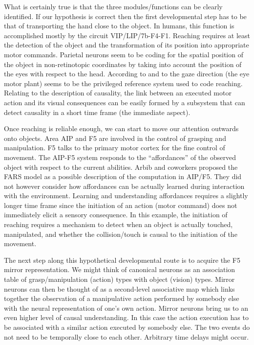 What is certainly true is that the three modules/functions can be 
clearly identified. If our hypothesis is correct then 
the first developmental step has to be that of transporting the hand 
close to the object. In humans, this function is accomplished mostly by the
circuit VIP/LIP/7b-F4-F1. Reaching requires at least the detection of
the object and the transformation of its position into appropriate 
motor commands. Parietal neurons seem to be coding for the spatial
position of the object in non-retinotopic coordinates by taking
into account the position of the eyes with respect to the head. 
According to \cite{pouget-ducom-torri-bavelier-2002} and 
to \cite{flanders-daghestani-berthoz-1999} the 
gaze direction (the eye motor plant) seems to be the privileged
reference system used to code reaching. 
Relating to the description of causality, the link between an executed
motor action and its visual consequences can be easily formed by 
a subsystem that can detect causality in a short time frame (the immediate
aspect).


Once reaching is reliable enough, we can start to move our attention 
outwards onto objects. Area AIP and F5 are involved in the
control of grasping and manipulation. F5 talks to the 
primary motor cortex for the fine control of movement. 
The AIP-F5 system responds to the ``affordances'' of the observed 
object with respect to the
current abilities.
Arbib and coworkers \cite{fagg-arbib-1998} proposed 
the FARS model as a possible description of the computation in AIP/F5. 
They did not however consider how affordances can be 
actually learned during interaction with the environment. 
Learning and understanding affordances requires a slightly longer 
time frame since the initiation of an action (motor command) does not
immediately elicit a sensory consequence. In this example, the initiation
of reaching requires a mechanism to detect when an object is actually 
touched, manipulated, and whether the collision/touch is causal to the
initiation of the movement.

The next step along this hypothetical developmental route is to 
acquire the F5 mirror representation. We might think of canonical neurons as
an association table of grasp/manipulation (action) types with object
(vision) types.  Mirror neurons can then be thought of as a 
second-level associative map which links together the observation of 
a manipulative action performed by somebody else with the neural 
representation of one's own action.
Mirror neurons bring us to an even higher level of causal 
understanding. In this case the action execution has to be associated
with a similar action executed by somebody else. The two events
do not need to be temporally close to each other. Arbitrary time delays
might occur.

